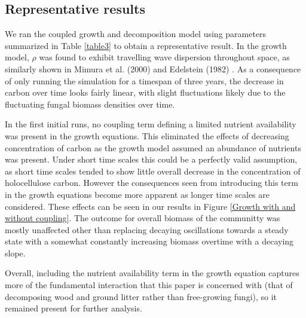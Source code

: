 \documentclass[12pt]{article}
\begin{document}
\begin{multicols}{2}
\subsection{Representative results}
We ran the coupled growth and decomposition model using parameters summarized in Table \ref{table3} to obtain a representative result. In the growth model, $\rho$ was found to exhibit travelling wave dispersion throughout space, as similarly shown in Mimura et al. (2000) and Edelstein (1982) \cite{Mimura2000, Edelstein1982}. As a consequence of only running the simulation for a timespan of three years, the decrease in carbon over time looks fairly linear, with slight fluctuations likely due to the fluctuating fungal biomass densities over time. 

In the first initial runs, no coupling term defining a limited nutrient availability was present in the growth equations. This eliminated the effects of decreasing concentration of carbon as the growth model assumed an abundance of nutrients was present. Under short time scales this could be a perfectly valid assumption, as short time scales tended to show little overall decrease in the concentration of holocellulose carbon. However the consequences seen from introducing this term in the growth equations become more apparent as longer time scales are considered. These effects can be seen in our results in Figure \ref{Growth with and without coupling}. The outcome for overall biomass of the communitty was mostly unaffected other than replacing decaying oscillations towards a steady state with a somewhat constantly increasing biomass overtime with a decaying slope. 

Overall, including the nutrient availability term in the growth equation captures more of the fundamental interaction that this paper is concerned with (that of decomposing wood and ground litter rather than free-growing fungi), so it remained present for further analysis.

\end{multicols}
\end{document}
